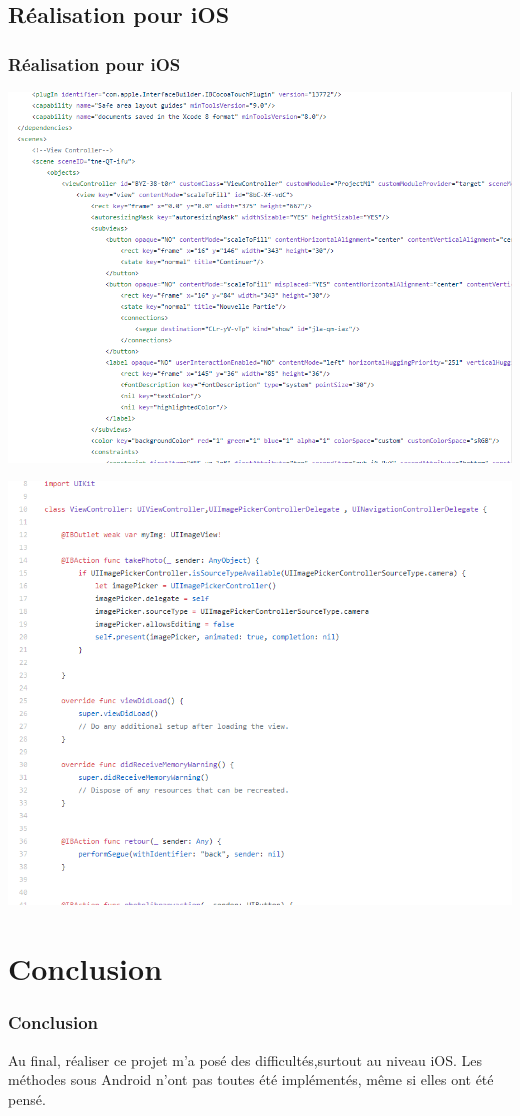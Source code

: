 \documentclass{beamer}
\begin{document}
\subsection{Réalisation pour iOS}
\begin{frame}
\frametitle{Réalisation pour iOS}
\begin{center}
  \includegraphics[scale=0.4]{ios_picture1.png}
\end{center}
\end{frame}

\begin{frame}
\begin{center}
  \includegraphics[scale=0.3]{iosCode1.png}
\end{center}
\end{frame}

\section{Conclusion}
\begin{frame}
\frametitle{Conclusion}
Au final, réaliser ce projet m'a posé des difficultés,surtout au niveau iOS. Les méthodes sous Android n'ont pas toutes été implémentés, même si elles ont été pensé.
\end{frame}
\end{document}
